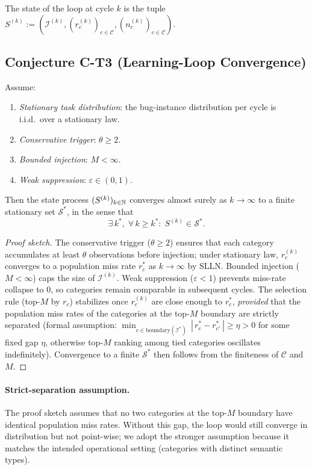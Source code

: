The state of the loop at cycle $k$ is the tuple $S^{(k)} := (\mathcal{I}^{(k)}, (r_c^{(k)})_{c \in \mathcal{C}}, (n_c^{(k)})_{c \in \mathcal{C}})$.

\subsection{Conjecture C-T3 (Learning-Loop Convergence)}

\begin{conjecture}
\label{conj:ct3}
Assume:
\begin{enumerate}[leftmargin=2em,label=(\roman*)]
\item \emph{Stationary task distribution}: the bug-instance distribution per cycle is i.i.d.\ over a stationary law.
\item \emph{Conservative trigger}: $\theta \ge 2$.
\item \emph{Bounded injection}: $M < \infty$.
\item \emph{Weak suppression}: $\varepsilon \in (0, 1)$.
\end{enumerate}
Then the state process $(S^{(k)})_{k \in \mathbb{N}}$ converges almost surely as $k \to \infty$ to a finite stationary set $\mathcal{S}^\ast$, in the sense that
\[ \exists\, k^\ast,\; \forall\, k \ge k^\ast: \; S^{(k)} \in \mathcal{S}^\ast. \]
\end{conjecture}

\begin{proof}[Proof sketch]
The conservative trigger ($\theta \ge 2$) ensures that each category accumulates at least $\theta$ observations before injection; under stationary law, $r_c^{(k)}$ converges to a population miss rate $r_c^\ast$ as $k \to \infty$ by SLLN. Bounded injection ($M < \infty$) caps the size of $\mathcal{I}^{(k)}$. Weak suppression ($\varepsilon < 1$) prevents miss-rate collapse to $0$, so categories remain comparable in subsequent cycles. The selection rule (top-$M$ by $r_c$) stabilizes once $r_c^{(k)}$ are close enough to $r_c^\ast$, \emph{provided} that the population miss rates of the categories at the top-$M$ boundary are strictly separated (formal assumption: $\min_{c \in \text{boundary}(\mathcal{I}^\ast)}\,|\,r_c^\ast - r_{c'}^\ast\,| \ge \eta > 0$ for some fixed gap $\eta$, otherwise top-$M$ ranking among tied categories oscillates indefinitely). Convergence to a finite $\mathcal{S}^\ast$ then follows from the finiteness of $\mathcal{C}$ and $M$.
\end{proof}

\paragraph{Strict-separation assumption.} The proof sketch assumes that no two categories at the top-$M$ boundary have identical population miss rates. Without this gap, the loop would still converge in distribution but not point-wise; we adopt the stronger assumption because it matches the intended operational setting (categories with distinct semantic types).

